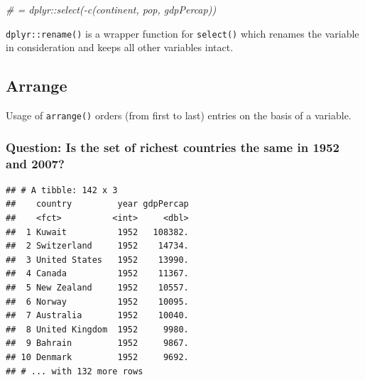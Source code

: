 \documentclass[12pt,]{article}
\newenvironment{Shaded}{\begin{snugshade}}{\end{snugshade}}
\newcommand{\KeywordTok}[1]{\textcolor[rgb]{0.13,0.29,0.53}{\textbf{#1}}}
\newcommand{\StringTok}[1]{\textcolor[rgb]{0.31,0.60,0.02}{#1}}
\newcommand{\CommentTok}[1]{\textcolor[rgb]{0.56,0.35,0.01}{\textit{#1}}}
\newcommand{\OperatorTok}[1]{\textcolor[rgb]{0.81,0.36,0.00}{\textbf{#1}}}
\newcommand{\NormalTok}[1]{#1}
\begin{document}
\begin{Shaded}
\begin{Highlighting}[]
\CommentTok{# = dplyr::select(-c(continent, pop, gdpPercap))}
\end{Highlighting}
\end{Shaded}

\texttt{dplyr::rename()} is a wrapper function for \texttt{select()}
which renames the variable in consideration and keeps all other
variables intact.

\subsection{Arrange}\label{arrange}

Usage of \texttt{arrange()} orders (from first to last) entries on the
basis of a variable.

\subsubsection{Question: Is the set of richest countries the same in
1952 and
2007?}\label{question-is-the-set-of-richest-countries-the-same-in-1952-and-2007}

\begin{Shaded}
\end{Shaded}

\begin{verbatim}
## # A tibble: 142 x 3
##    country         year gdpPercap
##    <fct>          <int>     <dbl>
##  1 Kuwait          1952   108382.
##  2 Switzerland     1952    14734.
##  3 United States   1952    13990.
##  4 Canada          1952    11367.
##  5 New Zealand     1952    10557.
##  6 Norway          1952    10095.
##  7 Australia       1952    10040.
##  8 United Kingdom  1952     9980.
##  9 Bahrain         1952     9867.
## 10 Denmark         1952     9692.
## # ... with 132 more rows
\end{verbatim}

\begin{Shaded}
\end{Shaded}
\end{document}
